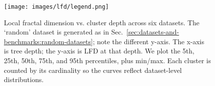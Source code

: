 \begin{figure}[t]
    \centering
    \hfill
  
    \par\medskip
    \hfill
  
    \par\medskip
    \hfill
  
    \par\smallskip
    \texttt{[image: images/lfd/legend.png]}
  
    \caption{Local fractal dimension vs. cluster depth across six datasets. The ‘random’ dataset is generated as in Sec.~\ref{sec:datasets-and-benchmarks:random-datasets}; note the different y-axis. The x-axis is tree depth; the y-axis is LFD at that depth. We plot the 5th, 25th, 50th, 75th, and 95th percentiles, plus min/max. Each cluster is counted by its cardinality so the curves reflect dataset-level distributions.}
    \label{fig:results:lfd-plots}
  \end{figure}




